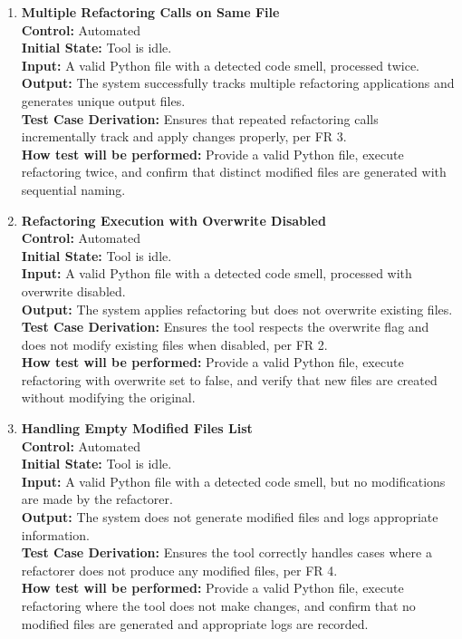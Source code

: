 \documentclass[12pt, titlepage]{article}
\begin{document}
\begin{enumerate}[label={\bf
    \textcolor{Maroon}{test-FR-IA-\arabic*}}, wide=0pt, font=\itshape]
\begin{enumerate}[label={\bf
    \textcolor{Maroon}{test-FR-IA-\arabic*}}, wide=0pt, font=\itshape]
    \item \textbf{Multiple Refactoring Calls on Same File} \\[2mm]
    \textbf{Control:} Automated \\
    \textbf{Initial State:} Tool is idle. \\
    \textbf{Input:} A valid Python file with a detected code smell, processed twice. \\
    \textbf{Output:} The system successfully tracks multiple refactoring applications and generates unique output files. \\[2mm]
    \textbf{Test Case Derivation:} Ensures that repeated refactoring calls incrementally track and apply changes properly, per FR 3. \\[2mm]
    \textbf{How test will be performed:} Provide a valid Python file, execute refactoring twice, and confirm that distinct modified files are generated with sequential naming.
    
    \item \textbf{Refactoring Execution with Overwrite Disabled} \\[2mm]
    \textbf{Control:} Automated \\
    \textbf{Initial State:} Tool is idle. \\
    \textbf{Input:} A valid Python file with a detected code smell, processed with overwrite disabled. \\
    \textbf{Output:} The system applies refactoring but does not overwrite existing files. \\[2mm]
    \textbf{Test Case Derivation:} Ensures the tool respects the overwrite flag and does not modify existing files when disabled, per FR 2. \\[2mm]
    \textbf{How test will be performed:} Provide a valid Python file, execute refactoring with overwrite set to false, and verify that new files are created without modifying the original.
    
    \item \textbf{Handling Empty Modified Files List} \\[2mm]
    \textbf{Control:} Automated \\
    \textbf{Initial State:} Tool is idle. \\
    \textbf{Input:} A valid Python file with a detected code smell, but no modifications are made by the refactorer. \\
    \textbf{Output:} The system does not generate modified files and logs appropriate information. \\[2mm]
    \textbf{Test Case Derivation:} Ensures the tool correctly handles cases where a refactorer does not produce any modified files, per FR 4. \\[2mm]
    \textbf{How test will be performed:} Provide a valid Python file, execute refactoring where the tool does not make changes, and confirm that no modified files are generated and appropriate logs are recorded.
    \end{enumerate}


\end{enumerate}
\end{document}
